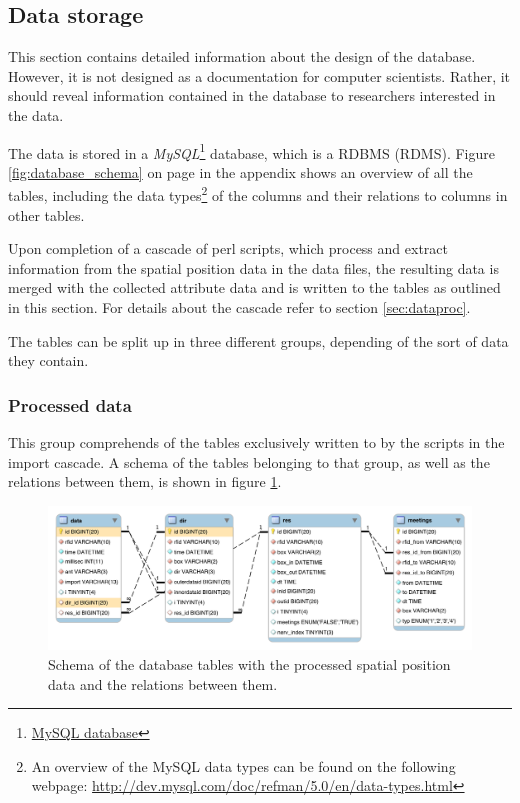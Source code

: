 \subsection{Data storage}
\label{subsec:datastorage}

This section contains detailed information about the design of the database. However, it is not designed as a documentation for computer scientists. Rather, it should reveal information contained in the database to researchers interested in the data.   

The data is stored in a \textit{MySQL}\footnote{\href{http://www.mysql.com/}{MySQL database}} database, which is  a \acf{RDBMS} (RDMS). Figure \ref{fig:database_schema} on page \pageref{fig:database_schema} in the appendix shows an overview of all the tables, including the data types\footnote{An overview of the MySQL data types can be found on the following webpage: \url{http://dev.mysql.com/doc/refman/5.0/en/data-types.html}} of the columns and their relations to columns in other tables.

Upon completion of a cascade of \ac{perl} scripts, which process and extract information from the spatial position data in the data files, the resulting data is merged with the collected attribute data and is written to the tables as outlined in this section. For details about the cascade refer to section \ref{sec:dataproc}. 

The tables can be split up in three different groups, depending of the sort of data they contain. 

\subsubsection{Processed data}
 
This group comprehends of the tables exclusively written to by the scripts in the import cascade. A schema of the tables belonging to that group, as well as the relations between them, is shown in figure \ref{fig:processed_data_schema}. 
 
\begin{figure}[htpb]
\begin{center}
  \includegraphics[width=\textwidth]{assets/pdf/processed_data_schema.pdf}
  \caption[Schema of database tables with processed data]{Schema of the database tables with the processed spatial position data and the relations between them.}
  \label{fig:processed_data_schema}
\end{center}
\end{figure} 

